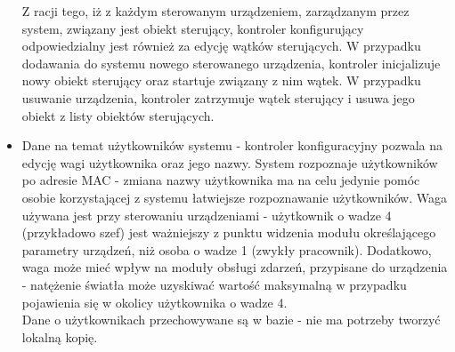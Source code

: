 \begin{itemize}
	Z racji tego, iż z każdym sterowanym urządzeniem, zarządzanym przez system, związany jest obiekt sterujący, kontroler konfigurujący odpowiedzialny jest również za edycję wątków sterujących. W przypadku dodawania do systemu nowego sterowanego urządzenia, kontroler inicjalizuje nowy obiekt sterujący oraz startuje związany z nim wątek. W przypadku usuwanie urządzenia, kontroler zatrzymuje wątek sterujący i usuwa jego obiekt z listy obiektów sterujących.
	\item Dane na temat użytkowników systemu - kontroler konfiguracyjny pozwala na edycję wagi użytkownika oraz jego nazwy. System rozpoznaje użytkowników po adresie MAC - zmiana nazwy użytkownika ma na celu jedynie pomóc osobie korzystającej z systemu łatwiejsze rozpoznawanie użytkowników. Waga używana jest przy sterowaniu urządzeniami - użytkownik o wadze 4 (przykładowo szef) jest ważniejszy z punktu widzenia modułu określającego parametry urządzeń, niż osoba o wadze 1 (zwykły pracownik). Dodatkowo, waga może mieć wpływ na moduły obsługi zdarzeń, przypisane do urządzenia - natężenie światła może uzyskiwać wartość maksymalną w przypadku pojawienia się w okolicy użytkownika o wadze 4.\\
	Dane o użytkownikach przechowywane są w bazie - nie ma potrzeby tworzyć lokalną kopię.
\end{itemize}
